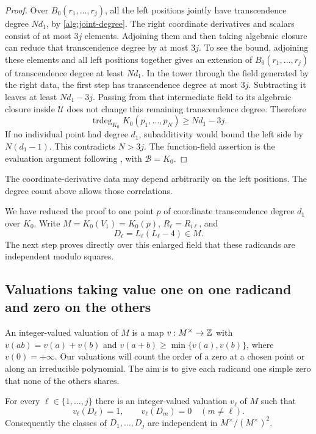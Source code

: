 \begin{proof}
Over \(B_0(r_1,\ldots,r_j)\), all the left positions jointly have
transcendence degree \(Nd_1\), by \eqref{alg:joint-degree}. The right
coordinate derivatives and scalars consist of at most \(3j\) elements. Adjoining
them and then taking algebraic closure can reduce that transcendence
degree by at most \(3j\). To see the bound, adjoining these elements
and all left positions together gives an extension of
\(B_0(r_1,\ldots,r_j)\) of transcendence degree at least \(Nd_1\).
In the tower through the field generated by the right data, the first
step has transcendence degree at most \(3j\). Subtracting it leaves
at least \(Nd_1-3j\). Passing from that intermediate field to its
algebraic closure inside \(\mathcal U\) does not change this remaining
transcendence degree. Therefore
\begin{equation}\label{alg:dimension-accounting}
 \operatorname{trdeg}_{K_0}K_0(p_1,\ldots,p_N)
       \ge Nd_1-3j.
\end{equation}
If no individual point had degree \(d_1\), subadditivity would bound
the left side by \(N(d_1-1)\). This contradicts \(N>3j\).
The function-field assertion is the evaluation argument following
, with \(\mathcal B=K_0\).
\end{proof}

The coordinate-derivative data may depend arbitrarily on the left positions. The
degree count above allows those correlations.

We have reduced the proof to one point \(p\) of coordinate transcendence degree \(d_1\) over \(K_0\). Write
\(M=K_0(V_1)=K_0(p)\), \(R_\ell=R_{i\ell}\), and
\[
 D_\ell=L_\ell(L_\ell-4)\in M.
\]
The next step proves directly over this enlarged field that these
radicands are independent modulo squares.

\subsection{Valuations taking value one on one radicand and zero on the others}

An integer-valued valuation of \(M\) is a map
\(v:M^\times\to\mathbb Z\) with \(v(ab)=v(a)+v(b)\) and
\(v(a+b)\ge\min\{v(a),v(b)\}\), where \(v(0)=+\infty\).
Our valuations will count the order of a zero at a chosen point or
along an irreducible polynomial. The aim is to give each radicand
one simple zero that none of the others shares.

\begin{lemma}\label{alg:private-valuations}
For every \(\ell\in\{1,\ldots,j\}\) there is an integer-valued
valuation \(v_\ell\) of \(M\) such that
\[
 v_\ell(D_\ell)=1,\qquad v_\ell(D_m)=0\quad(m\ne\ell).
\]
Consequently the classes of \(D_1,\ldots,D_j\) are independent in
\(M^\times/(M^\times)^2\).
\end{lemma}

